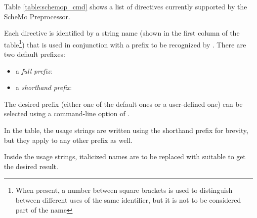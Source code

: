 Table \ref{table:schemop_cmd} shows a list of directives currently
supported by the ScheMo Preprocessor.

Each directive is identified by a string name (shown in the first
column of the table\footnote{When present, a number between square
brackets is used to distinguish between different uses of the same
identifier, but it is not to be considered part of the name}) that is
used in conjunction with a prefix to be recognized by .
There are two default prefixes:
\begin{itemize}
  \item a \textit{full prefix}: 
  \item a \textit{shorthand prefix}: 
\end{itemize}
The desired prefix (either one of the default ones or a user-defined
one) can be selected using a command-line option of .

In the table, the usage strings are written using the shorthand
prefix for brevity, but they apply to any other prefix as well.

Inside the usage strings, italicized names are to be replaced with
suitable to get the desired result. 

